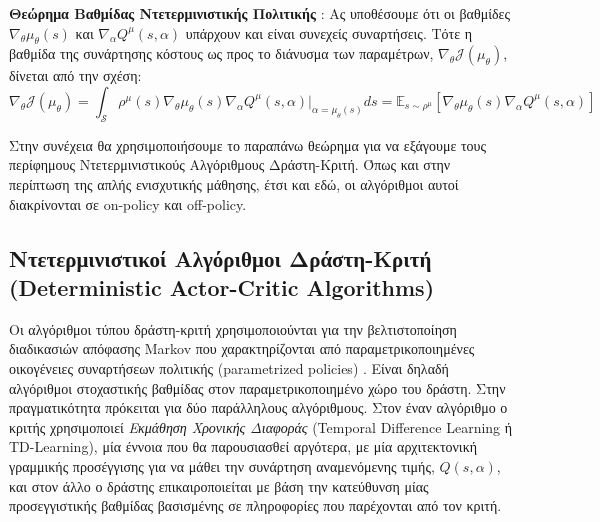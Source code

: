 \documentclass[11pt]{article} %
\numberwithin{equation}{subsection}
\begin{document}
\textbf{Θεώρημα Βαθμίδας Ντετερμινιστικής Πολιτικής} : Ας υποθέσουμε ότι οι βαθμίδες $\nabla_{\theta}\mu_{\theta}(s)$ και $\nabla_{\alpha}Q^{\mu}(s,\alpha)$ υπάρχουν και είναι συνεχείς συναρτήσεις. Τότε η βαθμίδα της συνάρτησης κόστους ως προς το διάνυσμα των παραμέτρων, $\nabla_{\theta} \mathcal{J}(\mu_{\theta})$, δίνεται από την σχέση:
\begin{equation}
\displaystyle \nabla_{\theta} \mathcal{J}(\mu_{\theta}) = \int_{\mathcal{S}} \rho^{\mu}(s) \nabla_{\theta} \mu_{\theta}(s) \nabla_{\alpha}Q^{\mu}(s, \alpha)|_{\alpha = \mu_{\theta}(s)} ds = \mathbb{E}_{s \sim \rho^{\mu}}[\nabla_{\theta} \mu_{\theta}(s) \nabla_{\alpha} Q^{\mu}(s,\alpha)]
\end{equation}

Στην συνέχεια θα χρησιμοποιήσουμε το παραπάνω θεώρημα για να εξάγουμε τους περίφημους Ντετερμινιστικούς Αλγόριθμους Δράστη-Κριτή. Όπως και στην περίπτωση της απλής ενισχυτικής μάθησης, έτσι και εδώ, οι αλγόριθμοι αυτοί διακρίνονται σε on-policy και off-policy.\\

\subsection{Ντετερμινιστικοί Αλγόριθμοι Δράστη-Κριτή (Deterministic Actor-Critic Algorithms)}

Οι αλγόριθμοι τύπου δράστη-κριτή χρησιμοποιούνται για την βελτιστοποίηση διαδικασιών απόφασης Markov που χαρακτηρίζονται από παραμετρικοποιημένες οικογένειες συναρτήσεων πολιτικής (parametrized policies) \cite{actorcritic}. Είναι δηλαδή αλγόριθμοι στοχαστικής βαθμίδας στον παραμετρικοποιημένο χώρο του δράστη. Στην πραγματικότητα πρόκειται για δύο παράλληλους αλγόριθμους. Στον έναν αλγόριθμο ο κριτής χρησιμοποιεί \textit{Εκμάθηση Χρονικής Διαφοράς} (Temporal Difference Learning ή TD-Learning), μία έννοια που θα παρουσιασθεί αργότερα, με μία αρχιτεκτονική γραμμικής προσέγγισης για να μάθει την συνάρτηση αναμενόμενης τιμής, $Q(s, \alpha)$, και στον άλλο ο δράστης επικαιροποιείται με βάση την κατεύθυνση μίας προσεγγιστικής βαθμίδας βασισμένης σε πληροφορίες που παρέχονται από τον κριτή. \\
\end{document}
